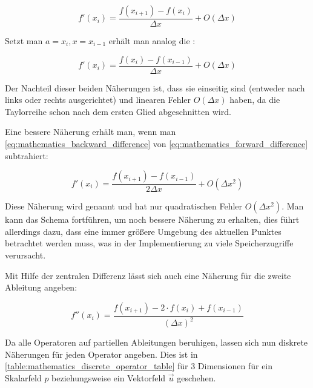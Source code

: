 \begin{equation}
\label{eq:mathematics_forward_difference}
f'(x_i) = \frac{f(x_{i+1}) - f(x_i)}{\Delta x} + O(\Delta x)
\end{equation}

Setzt man $a=x_i,x=x_{i-1}$ erhält man analog die
:

\begin{equation}
\label{eq:mathematics_backward_difference}
f'(x_i) = \frac{f(x_i) - f(x_{i-1})}{\Delta x} + O(\Delta x)
\end{equation}

Der Nachteil dieser beiden Näherungen ist, dass sie einseitig sind (entweder
nach links oder rechts ausgerichtet) und linearen Fehler $O(\Delta x)$ haben, da
die Taylorreihe schon nach dem ersten Glied abgeschnitten wird.

Eine bessere Näherung erhält man, wenn man
\autoref{eq:mathematics_backward_difference} von
\autoref{eq:mathematics_forward_difference} subtrahiert:

\begin{equation}
f'(x_i) = \frac{f(x_{i+1}) - f(x_{i-1})}{2 \Delta x} + O(\Delta x^2)
\end{equation}

Diese Näherung wird  genannt und hat
nur quadratischen Fehler $O(\Delta x^2)$. Man kann das Schema fortführen, um
noch bessere Näherung zu erhalten, dies führt allerdings dazu, dass eine immer
größere Umgebung des aktuellen Punktes betrachtet werden muss, was in der
Implementierung zu viele Speicherzugriffe verursacht.

Mit Hilfe der zentralen Differenz lässt sich auch eine Näherung für die zweite
Ableitung angeben:

\begin{equation}
f''(x_i)
=
\frac
{
	f(
		x_{i+1}) -
	2 \cdot
	f(
		x_i)
	+
	f(
		x_{i-1})
}
{
	(\Delta x)^2
}
\end{equation}

Da alle Operatoren auf partiellen Ableitungen beruhigen, lassen sich nun
diskrete Näherungen für jeden Operator angeben. Dies ist in
\autoref{table:mathematics_discrete_operator_table} für 3 Dimensionen für ein
Skalarfeld $p$ beziehungsweise ein Vektorfeld $\vec{u}$ geschehen.

